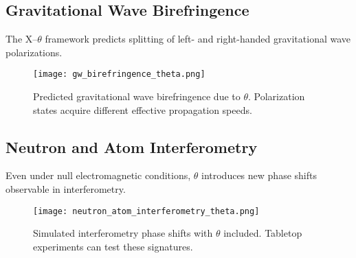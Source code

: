 \subsection{Gravitational Wave Birefringence}
The X--$\theta$ framework predicts splitting of left- and right-handed gravitational wave polarizations.

\begin{figure}[h]
  \centering
  \texttt{[image: gw\_birefringence\_theta.png]}
  \caption{Predicted gravitational wave birefringence due to $\theta$.
  Polarization states acquire different effective propagation speeds.}
  \label{fig:gw-birefringence}
\end{figure}

\subsection{Neutron and Atom Interferometry}
Even under null electromagnetic conditions, $\theta$ introduces new phase shifts observable in interferometry.

\begin{figure}[h]
  \centering
  \texttt{[image: neutron\_atom\_interferometry\_theta.png]}
  \caption{Simulated interferometry phase shifts with $\theta$ included.
  Tabletop experiments can test these signatures.}
  \label{fig:neutron-atom-interferometry}
\end{figure}
